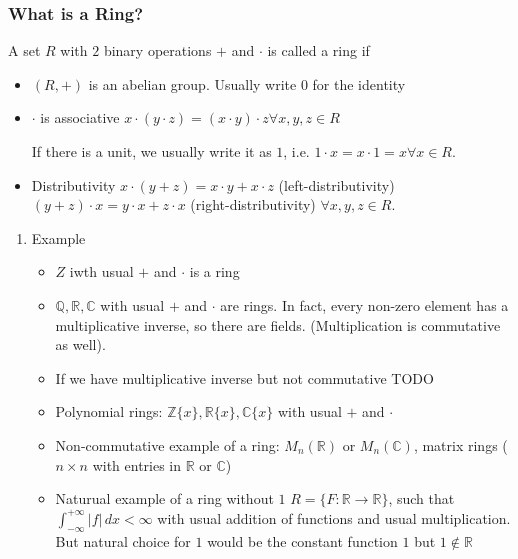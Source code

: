 \documentclass[11pt]{article}
\begin{document}
\subsubsection{What is a Ring?}
\label{sec:orgb988ce3}
A set \(R\) with \(2\) binary operations \(+\) and \(\cdot\) is called a ring if
\begin{itemize}
\item \((R, +)\) is an abelian group.
Usually write \(0\) for the identity

\item \(\cdot\) is associative
\(x \cdot(y \cdot z) = (x \cdot y) \cdot z \forall x,y,z \in R\)

If there is a unit, we usually write it as \(1\), i.e.
\(1 \cdot x = x \cdot 1 = x \forall x \in R\).

\item Distributivity
\(x \cdot (y + z) = x \cdot y + x \cdot z\) (left-distributivity)
\((y + z) \cdot x = y \cdot x + z \cdot x\) (right-distributivity)
\(\forall x,y,z \in R\).
\end{itemize}

\begin{enumerate}
\item Example
\label{sec:org762815e}
\begin{itemize}
\item \(Z\) iwth usual \(+\) and \(\cdot\) is a ring
\item \(\mathbb{Q}, \mathbb{R}, \mathbb{C}\) with usual \(+\) and \(\cdot\) are rings.
In fact, every non-zero element has a multiplicative inverse, so there are fields.
(Multiplication is commutative as well).
\item If we have multiplicative inverse but not commutative TODO
\item Polynomial rings: \(\mathbb{Z}\{x\}, \mathbb{R}\{x\}, \mathbb{C}\{x\}\)
with usual \(+\) and \(\cdot\)
\item Non-commutative example of a ring:
\(M_n(\mathbb{R})\) or \(M_n(\mathbb{C})\), matrix rings (\(n \times n\) with
entries in \(\mathbb{R}\) or \(\mathbb{C}\))
\item Naturual example of a ring without \(1\)
\(R = \{F : \mathbb{R} \to \mathbb{R}\}\), such that \(\displaystyle \int_{-\infty}^{+\infty} |f|\,dx < \infty\)
with usual addition of functions and usual multiplication. But natural
choice for \(1\) would be the constant function \(1\) but \(1 \notin \mathbb{R}\)
\end{itemize}
\end{enumerate}
\end{document}
